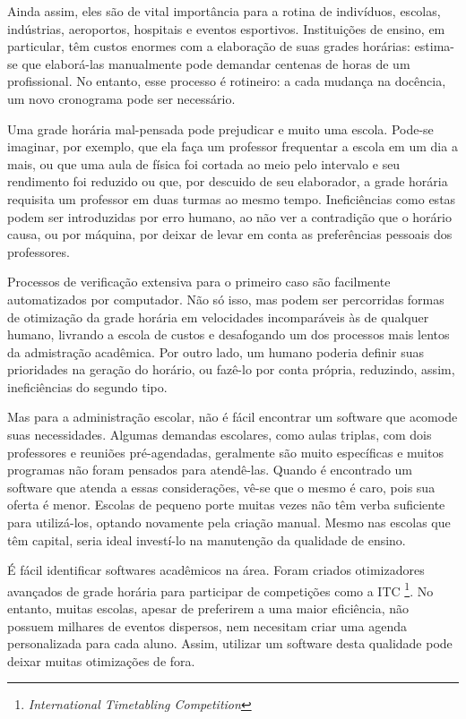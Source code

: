 \documentclass[12pt,a4paper]{article}
\begin{document}
			\par Ainda assim, eles são de vital importância para a rotina de indivíduos, escolas, indústrias, aeroportos, hospitais e eventos esportivos. Instituições de ensino, em particular, têm custos enormes com a elaboração de suas grades horárias: estima-se que elaborá-las manualmente pode demandar centenas de horas \cite{appleby} de um profissional. No entanto, esse processo é rotineiro: a cada mudança na docência, um novo cronograma pode ser necessário.

			\par Uma grade horária mal-pensada pode prejudicar e muito uma escola. Pode-se imaginar, por exemplo, que ela faça um professor frequentar a escola em um dia a mais, ou que uma aula de física foi cortada ao meio pelo intervalo e seu rendimento foi reduzido ou que, por descuido de seu elaborador, a grade horária requisita um professor em duas turmas ao mesmo tempo. Ineficiências como estas podem ser introduzidas por erro humano, ao não ver a contradição que o horário causa, ou por máquina, por deixar de levar em conta as preferências pessoais dos professores.

			\par Processos de verificação extensiva para o primeiro caso são facilmente automatizados por computador. Não só isso, mas podem ser percorridas formas de otimização da grade horária em velocidades incomparáveis às de qualquer humano, livrando a escola de custos e desafogando um dos processos mais lentos da admistração acadêmica. Por outro lado, um humano poderia definir suas prioridades na geração do horário, ou fazê-lo por conta própria, reduzindo, assim, ineficiências do segundo tipo.

			\par Mas para a administração escolar, não é fácil encontrar um software que acomode suas necessidades. Algumas demandas escolares, como aulas triplas, com dois professores e reuniões pré-agendadas, geralmente são muito específicas e muitos programas não foram pensados para atendê-las. Quando é encontrado um software que atenda a essas considerações, vê-se que o mesmo é caro, pois sua oferta é menor. Escolas de pequeno porte muitas vezes não têm verba suficiente para utilizá-los, optando novamente pela criação manual. Mesmo nas escolas que têm capital, seria ideal investí-lo na manutenção da qualidade de ensino.

			\par É fácil identificar softwares acadêmicos na área. Foram criados otimizadores avançados de grade horária para participar de competições como a ITC \footnote{\textit{International Timetabling Competition}}. No entanto, muitas escolas, apesar de preferirem a uma maior eficiência, não possuem milhares de eventos dispersos, nem necesitam criar uma agenda personalizada para cada aluno. Assim, utilizar um software desta qualidade pode deixar muitas otimizações de fora.
\end{document}

